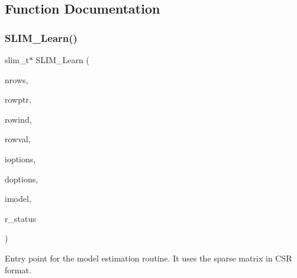 \subsection{Function Documentation}
\mbox{\label{group__slimapi_ga9c72d34ab6c2ba2b23d9d42ecee601ad}} 
\subsubsection{\texorpdfstring{S\+L\+I\+M\+\_\+\+Learn()}{SLIM\_Learn()}}
{\footnotesize\ttfamily slim\+\_\+t$\ast$ S\+L\+I\+M\+\_\+\+Learn (\begin{DoxyParamCaption}\item[{int32\+\_\+t}]{nrows,  }\item[{ssize\+\_\+t $\ast$}]{rowptr,  }\item[{int32\+\_\+t $\ast$}]{rowind,  }\item[{float $\ast$}]{rowval,  }\item[{int32\+\_\+t $\ast$}]{ioptions,  }\item[{double $\ast$}]{doptions,  }\item[{slim\+\_\+t $\ast$}]{imodel,  }\item[{int32\+\_\+t $\ast$}]{r\+\_\+status }\end{DoxyParamCaption})}



Entry point for the model estimation routine. It uses the sparse matrix in C\+SR format. 


